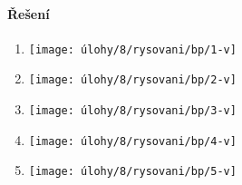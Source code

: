 \paragraph{Řešení}
\begin{enumerate}
    \item
    \begin{minipage}[t]{\linewidth}
        \begin{quote}
            \phantom{text}
        \end{quote}
        \centering
        \texttt{[image: úlohy/8/rysovani/bp/1-v]}

    \end{minipage}

    \item
    \begin{minipage}[t]{\linewidth}
        \begin{quote}
            \phantom{text}
        \end{quote}
        \centering
        \texttt{[image: úlohy/8/rysovani/bp/2-v]}

    \end{minipage}

    \item
    \begin{minipage}[t]{\linewidth}
        \begin{quote}
            \phantom{text}
        \end{quote}
        \centering
        \texttt{[image: úlohy/8/rysovani/bp/3-v]}

    \end{minipage}

    \item
    \begin{minipage}[t]{\linewidth}
        \begin{quote}
            \phantom{text}
        \end{quote}
        \centering
        \texttt{[image: úlohy/8/rysovani/bp/4-v]}

    \end{minipage}

    \item
    \begin{minipage}[t]{\linewidth}
        \begin{quote}
            \phantom{text}
        \end{quote}
        \centering
        \texttt{[image: úlohy/8/rysovani/bp/5-v]}


\end{minipage}
\end{enumerate}
